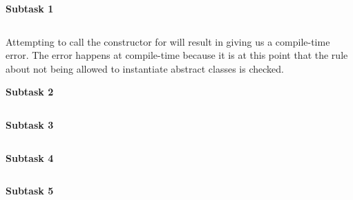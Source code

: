 \textbf{Subtask 1}

\inputminted{csharp}{\context/answer/Item.cs}

Attempting to call the constructor for  will result in \csharp giving us a compile-time error. The error happens at compile-time because it is at this point that the rule about not being allowed to instantiate abstract classes is checked.

\textbf{Subtask 2}

\inputminted{csharp}{\context/answer/IExpirable.cs}

\textbf{Subtask 3}

\inputminted{csharp}{\context/answer/exercise3/Item.cs}

\textbf{Subtask 4}

\inputminted{csharp}{\context/answer/exercise3/FoodItem.cs}

\textbf{Subtask 5}

\inputminted{csharp}{\context/answer/exercise3/Inventory.cs}

